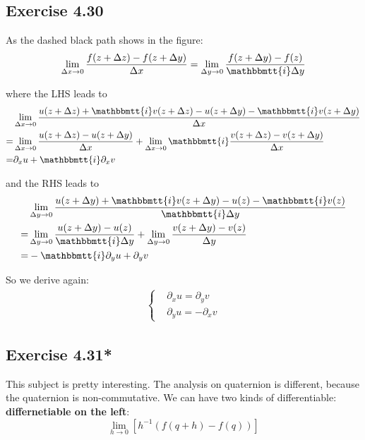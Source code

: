 \documentclass[]{ctexart}
\newcommand{\mi}{\mathbbmtt{i}}
\newcommand{\pa}{\partial}
\begin{document}
	\subsection{Exercise 4.30}
		As the dashed black path shows in the figure:
			\begin{equation*}
			\begin{aligned}
				\lim _{\Delta x \rightarrow 0} \frac{f(z+\Delta z)-f(z+\Delta y)}{ \Delta x}=\lim _{\Delta y \rightarrow 0} \frac{f(z+\Delta y)-f(z)}{\mi \Delta y}
			\end{aligned}
			\end{equation*}

			where the LHS leads to
				\begin{equation*}
				\begin{aligned}
					& \lim _{\Delta x \rightarrow 0} \frac{u(z+\Delta z)+\mi v(z+\Delta z)-u(z+\Delta y)-\mi v(z+\Delta y)}{ \Delta x} \\
					=& \lim _{\Delta x \rightarrow 0} \frac{u(z+\Delta z)-u(z+\Delta y)}{ \Delta x}+\lim _{\Delta x \rightarrow 0} \mi \frac{v(z+\Delta z)-v(z+\Delta y)}{\Delta x} \\
					=&\partial_{x} u+\mi \partial_{x} v
				\end{aligned}
				\end{equation*}
			
			and the RHS leads to
				\begin{equation*}
				\begin{aligned}
					&\lim _{\Delta y \rightarrow 0} \frac{u(z+\Delta y)+\mi v(z+\Delta y)-u(z)-\mi v(z)}{\mi \Delta y}\\
					=&\lim _{\Delta y \rightarrow 0} \frac{u(z+\Delta y)-u(z)}{\mi \Delta y}+\lim _{\Delta y \rightarrow 0} \frac{v(z+\Delta y)-v(z)}{\Delta y} \\
					=&-\mi \partial_{y} u+\partial_{y} v
				\end{aligned}
				\end{equation*}
			
			So we derive again:
				\begin{equation*}
				\begin{aligned}
					\begin{cases}
						&\pa_{x}u=\pa_{y}v\\
						&\pa_{y}u=-\pa_{x}v
					\end{cases}
				\end{aligned}
				\end{equation*}
			
	\subsection{Exercise 4.31*}
		This subject is pretty interesting. The analysis on quaternion is different, because the quaternion is non-commutative. We can have two kinds of differentiable:\textbf{ differnetiable on the left}:
			\begin{equation*}
				\lim_{h\rightarrow 0}[h^{-1}(f(q+h)-f(q))]
			\end{equation*}
			
\end{document}
